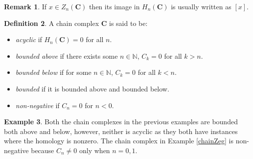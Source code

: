 \documentclass[11.5pt, twoside, a4paper, titlepage]{report}
\theoremstyle{definition}
\newtheorem{mydef}{Definition}[section]
\newtheorem{rem}[mydef]{Remark}
\newtheorem{eg}[mydef]{Example}
\theoremstyle{plain}
\begin{document}
\begin{rem} %
If $x\in Z_n(\mathbf{C})$ then its image in $H_n(\mathbf{C})$ is usually written as $[x]$.
\end{rem}

\begin{mydef}
A chain complex $\mathbf{C}$ is said to be:
\begin{itemize}
\item \emph{acyclic} if $H_n(\mathbf{C})=0$ for all $n$.
\item \emph{bounded above} if there exists some $n\in \mathbb{N}$, $C_k=0$ for all $k>n$.
\item \emph{bounded below} if for some $n \in \mathbb{N}$, $C_k=0$ for all $k<n$.
\item \emph{bounded} if it is bounded above and bounded below.
\item \emph{non-negative}  if $C_n=0$ for $n<0$.
\end{itemize}
\end{mydef}

\begin{eg}
Both the chain complexes in the previous examples are bounded both above and below, however, neither is acyclic as they both have instances where the homology is nonzero. The chain complex in Example \ref{chainZeg} is non-negative because $C_n\neq 0$ only when $n=0,1$.
\end{eg}
\end{document}
